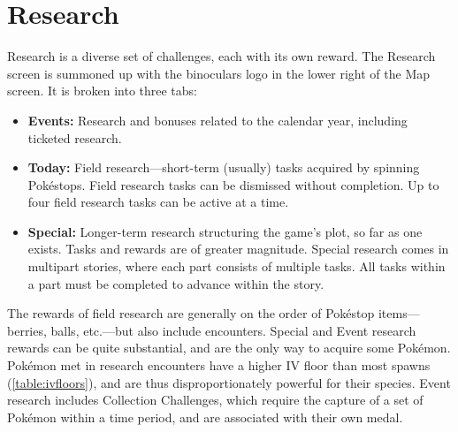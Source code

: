 \section{Research}
\label{sec:research}
Research is a diverse set of challenges, each with its own reward.
The Research screen is summoned up with the binoculars logo in the lower right of the Map screen.
It is broken into three tabs:
\begin{itemize}
  \item \textbf{Events:} Research and bonuses related to the calendar year, including ticketed research.
  \item \textbf{Today:} Field research---short-term (usually) tasks acquired by spinning Pokéstops.
            Field research tasks can be dismissed without completion.
            Up to four field research tasks can be active at a time.
  \item \textbf{Special:} Longer-term research structuring the game's plot, so far as one exists.
    Tasks and rewards are of greater magnitude.
    Special research comes in multipart stories, where each part consists of multiple tasks.
    All tasks within a part must be completed to advance within the story.
\end{itemize}
The rewards of field research are generally on the order of Pokéstop items---berries, balls,
 etc.---but also include encounters.
Special and Event research rewards can be quite substantial, and are the only way to acquire some Pokémon.
Pokémon met in research encounters have a higher IV floor than most spawns (\autoref{table:ivfloors}),
  and are thus disproportionately powerful for their species.
Event research includes Collection Challenges, which require the capture of a set of Pokémon
  within a time period, and are associated with their own medal.
